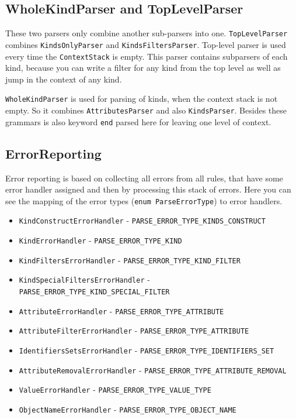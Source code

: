 \documentclass[deska]{subfiles}
\begin{document}
\subsection{WholeKindParser and TopLevelParser}

These two parsers only combine another sub-parsers into one. {\tt TopLevelParser} combines {\tt KindsOnlyParser} and
{\tt KindsFiltersParser}. Top-level parser is used every time the {\tt ContextStack} is empty. This parser contains subparsers
of each kind, because you can write a filter for any kind from the top level as well as jump in the context of any kind.

{\tt WholeKindParser} is used for parsing of kinds, when the context stack is not empty. So it combines {\tt AttributesParser}
and also {\tt KindsParser}. Besides these grammars is also keyword {\tt end} parsed here for leaving one level of context.

\subsection{ErrorReporting}

Error reporting is based on collecting all errors from all rules, that have some error handler assigned and then by
processing this stack of errors. Here you can see the mapping of the error types ({\tt enum ParseErrorType}) to
error handlers.

\begin{itemize}
    \item {\tt KindConstructErrorHandler} - {\tt PARSE\_ERROR\_TYPE\_KINDS\_CONSTRUCT}
    \item {\tt KindErrorHandler} - {\tt PARSE\_ERROR\_TYPE\_KIND}
    \item {\tt KindFiltersErrorHandler} - {\tt PARSE\_ERROR\_TYPE\_KIND\_FILTER}
    \item {\tt KindSpecialFiltersErrorHandler} - {\tt PARSE\_ERROR\_TYPE\_KIND\_SPECIAL\_FILTER}
    \item {\tt AttributeErrorHandler} - {\tt PARSE\_ERROR\_TYPE\_ATTRIBUTE}
    \item {\tt AttributeFilterErrorHandler} - {\tt PARSE\_ERROR\_TYPE\_ATTRIBUTE}
    \item {\tt IdentifiersSetsErrorHandler} - {\tt PARSE\_ERROR\_TYPE\_IDENTIFIERS\_SET}
    \item {\tt AttributeRemovalErrorHandler} - {\tt PARSE\_ERROR\_TYPE\_ATTRIBUTE\_REMOVAL}
    \item {\tt ValueErrorHandler} - {\tt PARSE\_ERROR\_TYPE\_VALUE\_TYPE}
    \item {\tt ObjectNameErrorHandler} - {\tt PARSE\_ERROR\_TYPE\_OBJECT\_NAME}
\end{itemize}
\end{document}
